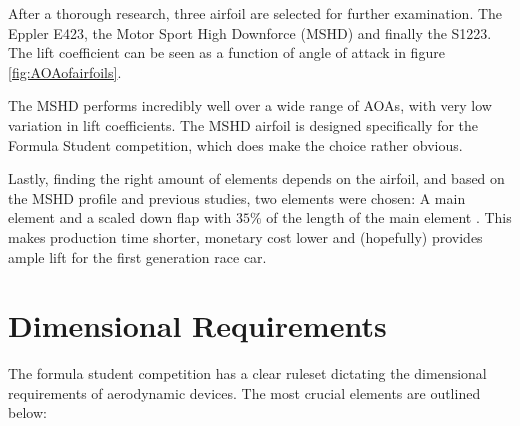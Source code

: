     After a thorough research, three airfoil are selected for further examination. The Eppler E423, the Motor Sport High Downforce (MSHD) and finally the S1223. The lift coefficient can be seen as a function of angle of attack in figure \ref{fig:AOAofairfoils}.

    The MSHD performs incredibly well over a wide range of AOAs, with very low variation in lift coefficients. The MSHD airfoil is designed specifically for the Formula Student competition, which does make the choice rather obvious.



    Lastly, finding the right amount of elements depends on the airfoil, and based on the MSHD profile and previous studies, two elements were chosen: A main element and a scaled down flap with $35\%$ of the length of the main element \cite{winginitialangle}. This makes production time shorter, monetary cost lower and (hopefully) provides ample lift for the first generation race car.

  \section{Dimensional Requirements}

    The formula student competition has a clear ruleset dictating the dimensional requirements of aerodynamic devices. The most crucial elements are outlined below:

